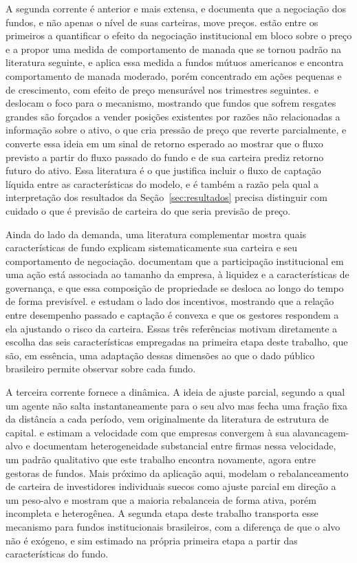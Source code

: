 \documentclass[12pt,a4paper]{article}
\begin{document}
A segunda corrente é anterior e mais extensa, e documenta que a negociação dos fundos, e não
apenas o nível de suas carteiras, move preços.  estão entre os
primeiros a quantificar o efeito da negociação institucional em bloco sobre o preço e a
propor uma medida de comportamento de manada que se tornou padrão na literatura seguinte, e
 aplica essa medida a fundos mútuos americanos e encontra
comportamento de manada moderado, porém concentrado em ações pequenas e de crescimento, com
efeito de preço mensurável nos trimestres seguintes.  e
 deslocam o foco para o mecanismo, mostrando que fundos que sofrem
resgates grandes são forçados a vender posições existentes por razões não relacionadas a
informação sobre o ativo, o que cria pressão de preço que reverte parcialmente, e
 converte essa ideia em um sinal de retorno esperado ao mostrar que o
fluxo previsto a partir do fluxo passado do fundo e de sua carteira prediz retorno futuro do
ativo. Essa literatura é o que justifica incluir o fluxo de captação líquida entre as
características do modelo, e é também a razão pela qual a interpretação dos resultados da
Seção~\ref{sec:resultados} precisa distinguir com cuidado o que é previsão de carteira do
que seria previsão de preço.

Ainda do lado da demanda, uma literatura complementar mostra quais características de fundo
explicam sistematicamente sua carteira e seu comportamento de negociação.
 documentam que a participação institucional em uma ação está
associada ao tamanho da empresa, à liquidez e a características de governança, e que essa
composição de propriedade se desloca ao longo do tempo de forma previsível.
 e  estudam o lado dos incentivos, mostrando
que a relação entre desempenho passado e captação é convexa e que os gestores respondem a
ela ajustando o risco da carteira. Essas três referências motivam diretamente a escolha das
seis características empregadas na primeira etapa deste trabalho, que são, em essência, uma
adaptação dessas dimensões ao que o dado público brasileiro permite observar sobre cada
fundo.

A terceira corrente fornece a dinâmica. A ideia de ajuste parcial, segundo a qual um agente
não salta instantaneamente para o seu alvo mas fecha uma fração fixa da distância a cada
período, vem originalmente da literatura de estrutura de capital.  e
 estimam a velocidade com que empresas convergem à sua
alavancagem-alvo e documentam heterogeneidade substancial entre firmas nessa velocidade, um
padrão qualitativo que este trabalho encontra novamente, agora entre gestoras de fundos.
Mais próximo da aplicação aqui,  modelam o rebalanceamento de carteira
de investidores individuais suecos como ajuste parcial em direção a um peso-alvo e mostram
que a maioria rebalanceia de forma ativa, porém incompleta e heterogênea. A segunda etapa
deste trabalho transporta esse mecanismo para fundos institucionais brasileiros, com a
diferença de que o alvo não é exógeno, e sim estimado na própria primeira etapa a partir das
características do fundo.
\end{document}
